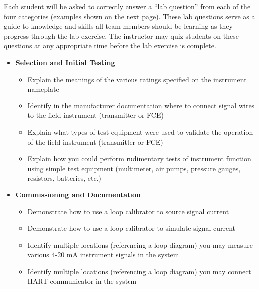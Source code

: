 Each student will be asked to correctly answer a ``lab question'' from each of the four categories (examples shown on the next page).  These lab questions serve as a guide to knowledge and skills all team members should be learning as they progress through the lab exercise.  The instructor may quiz students on these questions at any appropriate time before the lab exercise is complete.

\vfil \eject

\noindent
{} 

\begin{itemize}
\item{} {\bf Selection and Initial Testing}
\begin{itemize}

\item{} Explain the meanings of the various ratings specified on the instrument nameplate
\item{} Identify in the manufacturer documentation where to connect signal wires to the field instrument (transmitter or FCE)
\item{} Explain what types of test equipment were used to validate the operation of the field instrument (transmitter or FCE)
\item{} Explain how you could perform rudimentary tests of instrument function using simple test equipment (multimeter, air pumps, pressure gauges, resistors, batteries, etc.)
\end{itemize}
\end{itemize}

\filbreak

\begin{itemize}
\item{} {\bf Commissioning and Documentation}
\begin{itemize}

\item{} Demonstrate how to use a loop calibrator to source signal current
\item{} Demonstrate how to use a loop calibrator to simulate signal current
\item{} Identify multiple locations (referencing a loop diagram) you may measure various 4-20 mA instrument signals in the system
\item{} Identify multiple locations (referencing a loop diagram) you may connect HART communicator in the system
\end{itemize}
\end{itemize}


